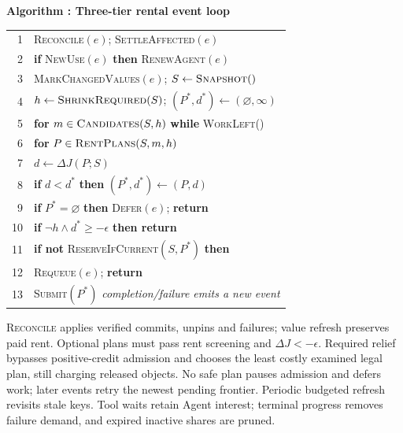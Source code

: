 \par\medskip\noindent\begin{minipage}{\columnwidth}
\raggedright
 \label{alg:placement}
 \textbf{Algorithm \thedesignalgorithm: Three-tier rental event loop}
 \par\smallskip
 \begin{tabularx}{\columnwidth}{@{}r@{\quad}X@{}}
 \toprule
 1 & \textsc{Reconcile}$(e)$; \textsc{SettleAffected}$(e)$ \\
 2 & \textbf{if} \textsc{NewUse}$(e)$ \textbf{then} \textsc{RenewAgent}$(e)$ \\
 3 & \textsc{MarkChangedValues}$(e)$; $S\gets\textsc{Snapshot}()$ \\
 4 & $h\gets\textsc{ShrinkRequired}(S)$; $(P^*,d^*)\gets(\varnothing,\infty)$ \\
 5 & \textbf{for} $m\in\textsc{Candidates}(S,h)$ \textbf{while} \textsc{WorkLeft}() \\
 6 & \quad \textbf{for} $P\in\textsc{RentPlans}(S,m,h)$ \\
 7 & \qquad $d\gets\Delta J(P;S)$ \\
 8 & \qquad \textbf{if} $d<d^*$ \textbf{then} $(P^*,d^*)\gets(P,d)$ \\
 9 & \textbf{if} $P^*=\varnothing$ \textbf{then} \textsc{Defer}$(e)$; \textbf{return} \\
 10 & \textbf{if} $\neg h\land d^*\ge-\epsilon$ \textbf{then return} \\
 11 & \textbf{if not} \textsc{ReserveIfCurrent}$(S,P^*)$ \textbf{then} \\
 12 & \quad \textsc{Requeue}$(e)$; \textbf{return} \\
 13 & \textsc{Submit}$(P^*)$ \quad\textit{completion/failure emits a new event} \\
 \bottomrule
 \end{tabularx}
\end{minipage}\par\medskip

\textsc{Reconcile} applies verified commits, unpins and failures;
value refresh preserves paid rent. Optional
plans must pass rent screening and $\Delta J<-\epsilon$. Required relief
bypasses positive-credit admission and chooses the least costly examined
legal plan, still charging released objects. No safe plan pauses admission
and defers work; later events retry the newest pending frontier.
Periodic budgeted refresh revisits stale keys. Tool waits retain Agent
interest; terminal progress removes failure demand, and expired inactive
shares are pruned.

